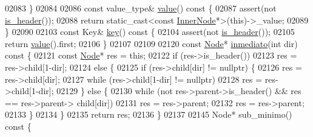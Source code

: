 \begin{DoxyCode}
02083         \}
02084 
02086         \textcolor{keyword}{const} value\_type& \hyperlink{structaed2_1_1map_1_1Node_af4ada8e79dabb4849fc87de63d3970fb_af4ada8e79dabb4849fc87de63d3970fb}{value}()\textcolor{keyword}{ const }\{
02087             assert(not \hyperlink{structaed2_1_1map_1_1Node_ae6cc4598a60dbab7120ffae58ebbadca_ae6cc4598a60dbab7120ffae58ebbadca}{is_header}());
02088             \textcolor{keywordflow}{return} \textcolor{keyword}{static\_cast<}\textcolor{keyword}{const }\hyperlink{structaed2_1_1map_1_1InnerNode}{InnerNode}*\textcolor{keyword}{>}(\textcolor{keyword}{this})->\_value;
02089         \}
02090 
02103         \textcolor{keyword}{const} Key& \hyperlink{structaed2_1_1map_1_1Node_a5451f8da0b7ad3582fab1decad5d09cb_a5451f8da0b7ad3582fab1decad5d09cb}{key}()\textcolor{keyword}{ const }\{
02104             assert(not \hyperlink{structaed2_1_1map_1_1Node_ae6cc4598a60dbab7120ffae58ebbadca_ae6cc4598a60dbab7120ffae58ebbadca}{is_header}());
02105             \textcolor{keywordflow}{return} \hyperlink{structaed2_1_1map_1_1Node_af4ada8e79dabb4849fc87de63d3970fb_af4ada8e79dabb4849fc87de63d3970fb}{value}().first;
02106         \}
02107 
02109 
02120         \textcolor{keyword}{const} \hyperlink{structaed2_1_1map_1_1Node_a9c1a600491066ce7eb669b1cb76d56c6_a9c1a600491066ce7eb669b1cb76d56c6}{Node}* \hyperlink{structaed2_1_1map_1_1Node_a4d5263c74ea5f78025fea331267730ce_a4d5263c74ea5f78025fea331267730ce}{inmediato}(\textcolor{keywordtype}{int} dir)\textcolor{keyword}{ const }\{
02121             \textcolor{keyword}{const} \hyperlink{structaed2_1_1map_1_1Node_a9c1a600491066ce7eb669b1cb76d56c6_a9c1a600491066ce7eb669b1cb76d56c6}{Node}* res = \textcolor{keyword}{this};
02122             \textcolor{keywordflow}{if} (res->is\_header())
02123                 res = res->child[1-dir];
02124             \textcolor{keywordflow}{else} \{
02125                 if (res->child[dir] != \textcolor{keyword}{nullptr}) \{
02126                     res = res->child[dir];
02127                     \textcolor{keywordflow}{while} (res->child[1-dir] != \textcolor{keyword}{nullptr})
02128                         res = res->child[1-dir];
02129                 \} \textcolor{keywordflow}{else} \{
02130                     \textcolor{keywordflow}{while} (not res->parent->is\_header() && res == res->parent->
      child[dir])
02131                         res = res->parent;
02132                     res = res->parent;
02133                 \}
02134             \}
02135             \textcolor{keywordflow}{return} res;
02136         \}
02137 
02145         Node* sub\_minimo()\textcolor{keyword}{ const }\{

\end{DoxyCode}
